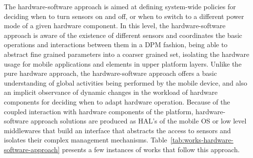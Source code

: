 \documentclass[ENG,PhD]{cinvestav}
\begin{document}
The hardware-software approach is aimed at defining system-wide policies for deciding when to turn sensors on and off, or when to switch to a different power mode of a given hardware component.
In this level, the hardware-software approach is aware of the existence of different sensors and coordinates the basic operations and interactions between them in a DPM fashion, being able to abstract fine grained parameters into a coarser grained set, isolating the hardware usage for mobile applications and elements in upper platform layers.
Unlike the pure hardware approach, the hardware-software approach offers a basic understanding of global activities being performed by the mobile device, and also an implicit observance of dynamic changes in the workload of hardware components for deciding when to adapt hardware operation.
Because of the coupled interaction with hardware components of the platform, hardware-software approach solutions are produced as HAL's of the mobile OS or low level middlewares that build an interface that abstracts the access to sensors and isolates their complex management mechanisms.
Table~\ref{tab:works-hardware-software-approach} presents a few instances of works that follow this approach.


\end{document}
